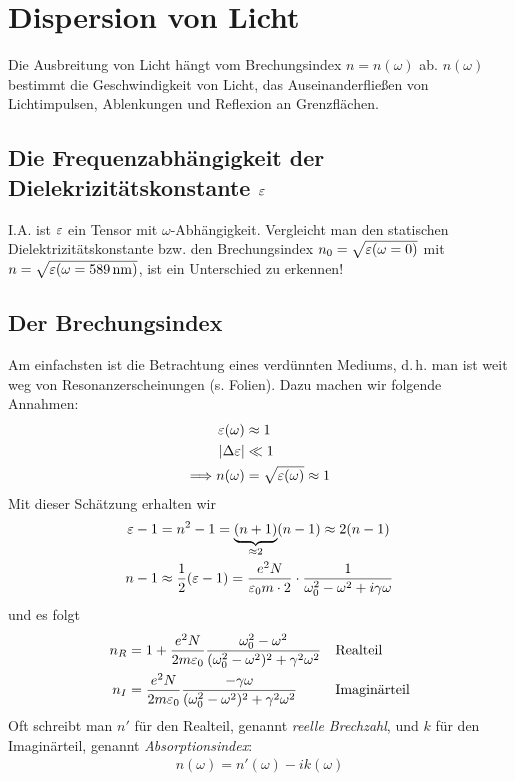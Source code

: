 
\chapter{Dispersion von Licht}
Die Ausbreitung von Licht hängt vom Brechungsindex $n=n(\omega)$
ab. $n(\omega)$ bestimmt die Geschwindigkeit von Licht, das
Auseinanderfließen von Lichtimpulsen, Ablenkungen und Reflexion an
Grenzflächen. 

\section{Die Frequenzabhängigkeit der Dielekrizitätskonstante $\varepsilon$}
I.A. ist $\varepsilon$ ein Tensor mit $\omega$-Abhängigkeit. Vergleicht man
den statischen Dielektrizitätskonstante bzw. den Brechungsindex
$n_0=\sqrt{\varepsilon(\omega=0)}$ mit $
n=\sqrt{\varepsilon(\omega=\SI{589}{\nano\meter})}$, ist ein Unterschied zu erkennen!

\section{Der Brechungsindex}
Am einfachsten ist die Betrachtung eines verdünnten Mediums,
d.\,h. man ist weit weg von Resonanzerscheinungen (s. Folien).
Dazu machen wir folgende Annahmen:
\begin{align*}
  \varepsilon(\omega) &\approx 1\\
  |\Delta\varepsilon| &\ll 1\\
\Longrightarrow n(\omega) &= \sqrt{\varepsilon(\omega)} \approx 1
\end{align*}
Mit dieser Schätzung erhalten wir
\begin{align*}
  \varepsilon - 1 &= n^2-1 = \underbrace{(n+1)}_{\approx 2}(n-1) \approx 2(n-1)\\
  n-1 &\approx \frac{1}{2} (\varepsilon -1) 
  = \frac{e^2N}{\varepsilon_0 m\cdot 2}\cdot
  \frac{1}{\omega_0^2-\omega^2 + i\gamma\omega}
\end{align*}
und es folgt
\begin{align*}
  n_R &= 1 + \frac{e^2N}{2m\varepsilon_0} 
        \frac{\omega_0^2-\omega^2}{(\omega_0^2-\omega^2)^2 + \gamma^2\omega^2}
  && \text{Realteil}\\
  n_I &= \frac{e^2N}{2m\varepsilon_0}
        \frac{-\gamma\omega}{(\omega_0^2-\omega^2)^2 + \gamma^2\omega^2}
  && \text{Imaginärteil}\\
\end{align*}
Oft schreibt man $n'$ für den Realteil, genannt 
\emph{reelle Brechzahl}, und 
$k$ für den Imaginärteil, genannt
\emph{Absorptionsindex}:
\begin{gather*}
  n(\omega) = n'(\omega) - ik(\omega)
\end{gather*}%
%
%


